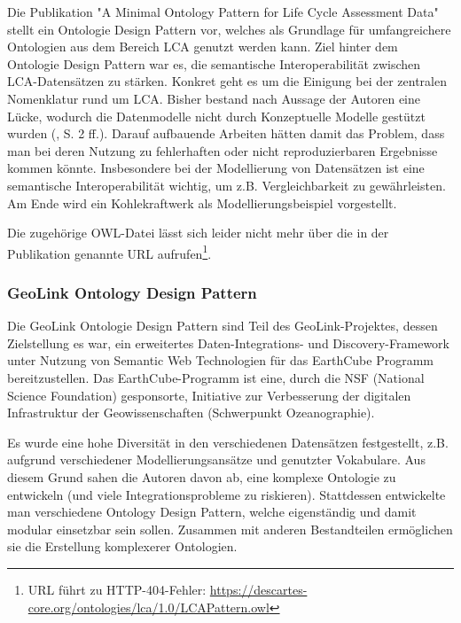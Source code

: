 \documentclass{article}
\begin{document}

Die Publikation "A Minimal Ontology Pattern for Life Cycle Assessment Data"\cite{vardem2015anminimal} stellt ein Ontologie Design Pattern vor, welches als Grundlage für umfangreichere Ontologien aus dem Bereich LCA genutzt werden kann.
Ziel hinter dem Ontologie Design Pattern war es, die semantische Interoperabilität zwischen LCA-Datensätzen zu stärken.
Konkret geht es um die Einigung bei der zentralen Nomenklatur rund um LCA.
Bisher bestand nach Aussage der Autoren eine Lücke, wodurch die Datenmodelle nicht durch Konzeptuelle Modelle gestützt wurden (\cite{vardem2015anminimal}, S. 2 ff.).
Darauf aufbauende Arbeiten hätten damit das Problem, dass man bei deren Nutzung zu fehlerhaften oder nicht reproduzierbaren Ergebnisse kommen könnte.
Insbesondere bei der Modellierung von Datensätzen ist eine semantische Interoperabilität wichtig, um z.B. Vergleichbarkeit zu gewährleisten.
Am Ende wird ein Kohlekraftwerk als Modellierungsbeispiel vorgestellt.

Die zugehörige  OWL-Datei lässt sich leider nicht mehr über die in der Publikation genannte URL aufrufen\footnote{URL führt zu HTTP-404-Fehler: \url{https://descartes-core.org/ontologies/lca/1.0/LCAPattern.owl}}.

\subsubsection{GeoLink Ontology Design Pattern}


Die GeoLink Ontologie Design Pattern \cite{krisnadhi2015geolinkStart} sind Teil des GeoLink-Projektes, dessen Zielstellung es war, ein erweitertes Daten-Integrations- und Discovery-Framework unter Nutzung von Semantic Web Technologien für das EarthCube Programm bereitzustellen.
Das EarthCube-Programm ist eine, durch die NSF (National Science Foundation) gesponsorte, Initiative zur Verbesserung der digitalen Infrastruktur der Geowissenschaften (Schwerpunkt Ozeanographie).

Es wurde eine hohe Diversität in den verschiedenen Datensätzen festgestellt, z.B. aufgrund verschiedener Modellierungsansätze und genutzter Vokabulare.
Aus diesem Grund sahen die Autoren davon ab, eine komplexe Ontologie zu entwickeln (und viele Integrationsprobleme zu riskieren). Stattdessen entwickelte man verschiedene Ontology Design Pattern, welche eigenständig und damit modular einsetzbar sein sollen.
Zusammen mit anderen Bestandteilen ermöglichen sie die Erstellung komplexerer Ontologien.
\end{document}
